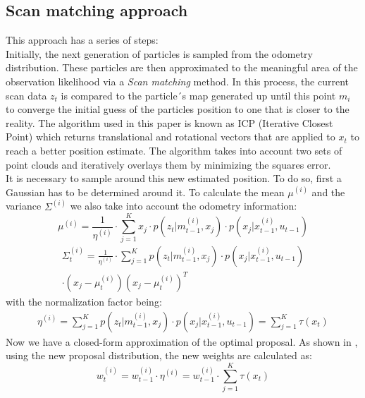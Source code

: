 \documentclass[letterpaper]{article}
\begin{document}
\subsection{Scan matching approach}
This approach has a series of steps:\\
Initially, the next generation of particles is sampled from the odometry distribution.
These particles are then approximated to the meaningful area of the observation likelihood via a \textit{Scan matching} method. In this process, the current scan data $z_t$ is compared to the particle´s map generated up until this point $m_i$ to converge the initial guess of the particles position to one that is closer to the reality. The algorithm used in this paper is known as ICP (Iterative Closest Point) which returns translational and rotational vectors that are applied to $x_t$ to reach a better position estimate. The algorithm takes into account two sets of point clouds and iteratively overlays them by minimizing the squares error.\\
It is necessary to sample around this new estimated position. To do so, first a Gaussian has to be determined around it. To calculate the mean $\mu^{(i)}$ and the variance $\Sigma^{(i)}$ we also take into account the odometry information:
\begin{equation}
\label{mu}
\mu^{(i)}= \frac{1}{\eta^{(i)}}\cdot \sum_{j=1}^K x_j \cdot p(z_t|m_{t-1}^{(i)}, x_j) \cdot p(x_j|x_{t-1}^{(i)}, u_{t-1})
\end{equation} 
\begin{multline}
\label{sigma}
 \Sigma_t^{(i)}= \frac{1}{\eta^{(i)}}\cdot \sum_{j=1}^K p(z_t|m_{t-1}^{(i)}, x_j) \cdot p(x_j|x_{t-1}^{(i)}, u_{t-1}) \\ \cdot (x_j - \mu_t^{(i)})(x_j - \mu_t^{(i)})^T 
\end{multline} 
with the normalization factor being:
\begin{multline}
\eta^{(i)}= \sum_{j=1}^K p(z_t|m_{t-1}^{(i)}, x_j) \cdot p(x_j|x_{t-1}^{(i)}, u_{t-1}) =\sum_{j=1}^K \tau (x_t)
\end{multline} 
Now we have a closed-form approximation of the optimal proposal. As shown in \cite{Cyrill}, using the new proposal distribution, the new weights are calculated as:
\begin{equation}
\label{Weights}
w_t^{(i)}=w_{t-1}^{(i)} \cdot \eta^{(i)} = w_{t-1}^{(i)} \cdot \sum_{j=1}^K \tau (x_t)
\end{equation} 
\end{document}
